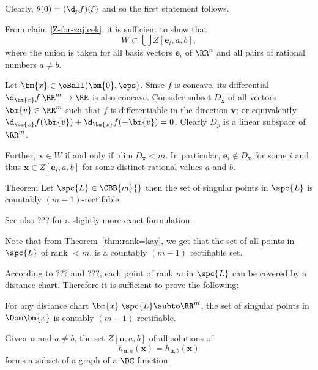 Clearly, $\theta(0)=(\d_p f)(\xi)$ and so the first statement follows.\qeds
















From claim \ref{Z-for-zajicek}, it is sufficient to show that 
$$W\subset \bigcup Z[\bm{e}_i,a,b],$$
where the union is taken for all basis vectors $\bm{e}_i$ of $\RR^n$ and all pairs of rational numbers $a\not=b$.

Let $\bm{x}\in \oBall(\bm{0},\eps)$.
Sinse $f$ is concave, 
its differential $\d_{\bm{x}}f\:\RR^m\to\RR$ is also concave.
Consider subset $D_{\bm{x}}$ of all vectors $\bm{v}\in\RR^m$ such that $f$ is differentiable in the direction $\bm{v}$; or equivalently $\d_{\bm{x}}f(\bm{v})+\d_{\bm{x}}f(-\bm{v})=0$.
Clearly $D_p$ is a linear subspace of $\RR^m$.

Further, $\bm{x}\in W$ if and only if $\dim D_{\bm{x}}<m$.
In particular, 
$\bm{e}_i\notin D_{\bm{x}}$ for some $i$ 
and thus $\bm{x}\in Z[\bm{e}_i,a,b]$ for some distinct rational values $a$ and $b$.
\qeds




\begin{thm}{Theorem}
Let $\spc{L}\in\CBB{m}{}$ then the set of singular points in $\spc{L}$ is countably $(m-1)$-rectifable.
\end{thm}

See also ??? for a slightly more exact formulation.

Note that from Theorem~\ref{thm:rank=kay},
we get that the set of all points in $\spc{L}$ of rank $<m$,
is a countably $(m-1)$ rectifiable set.

According to ??? and ???,
each point of rank $m$ in $\spc{L}$ can be covered by a distance chart.
Therefore it is sufficient to prove the following:

\begin{clm}{}
For any distance chart $\bm{x}\:\spc{L}\subto\RR^m$,
the set of singular points in $\Dom\bm{x}$
is contably $(m-1)$-rectifiable.
\end{clm}









\begin{clm}{}\label{Z-for-zajicek}
Given $\bm{u}$ and $a\not=b$, 
the set $Z[\bm{u},a,b]$ of all solutions of
$$h_{\bm{u}, a}(\bm{x})
=
h_{\bm{u}, b}(\bm{x})$$ 
forms a subset of a graph of a $\DC$-function.
\end{clm}

